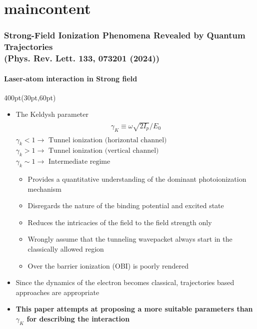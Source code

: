
\section{maincontent}

\begin{frame}
\frametitle{Strong-Field Ionization Phenomena Revealed by Quantum Trajectories \\
\small (Phys. Rev. Lett. \textbf{133}, 073201 (2024))}
\framesubtitle{Laser-atom interaction in Strong field}


\footnotesize
 
\begin{textblock*}{400pt}(30pt,60pt)
\begin{itemize}
\footnotesize
\item The Keldysh parameter
\begin{align}
\begin{split}
 \gamma_K \equiv \omega\sqrt{2I_p}/E_0
\end{split}
 \nonumber 
\end{align}
$\gamma_k < 1 \longrightarrow \mbox{ Tunnel ionization (horizontal channel)}$ \\
$\gamma_k > 1 \longrightarrow \mbox{ Tunnel ionization (vertical channel)}$ \\
$\gamma_k \sim 1 \longrightarrow \mbox{ Intermediate regime}$ 

\begin{itemize}
\footnotesize
 \item[$\bullet$] Provides a quantitative understanding of the dominant
photoionization mechanism
\end{itemize}
\begin{itemize}
\footnotesize
 \item[$\bullet$] Disregards the nature of the binding potential
and excited state
 \item[$\bullet$] Reduces the intricacies of the field to the field strength
only
 \item[$\bullet$] Wrongly assume that the tunneling wavepacket 
always start in the classically allowed region
 \item[$\bullet$] Over the barrier ionization (OBI) is poorly rendered
\end{itemize}
\vspace{10pt}
\item Since the dynamics of the electron becomes classical, 
trajectories based approaches are appropriate 
\vspace{15pt}
\item \textbf{This paper attempts at proposing a more suitable parameters
than $\gamma_K$ for describing the interaction}


\end{itemize}
\end{textblock*}
\end{frame}
